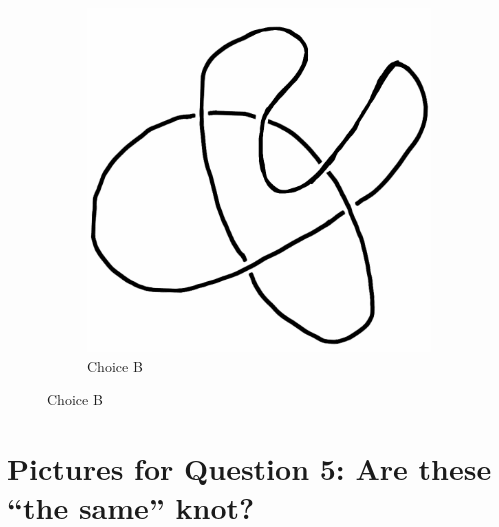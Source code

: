 \documentclass[12pt,letterpaper]{article}
\theoremstyle{definition}
\begin{document}
\begin{figure}[h!]
\begin{subfigure}[b]{0.4\textwidth}
        \includegraphics[width=\textwidth]{meeting06pics/9SeptQ4b.png}
        \caption{Choice B}
    \end{subfigure}
\end{figure}

\clearpage

\section*{Pictures for Question 5: Are these ``the same'' knot?}
\end{document}
